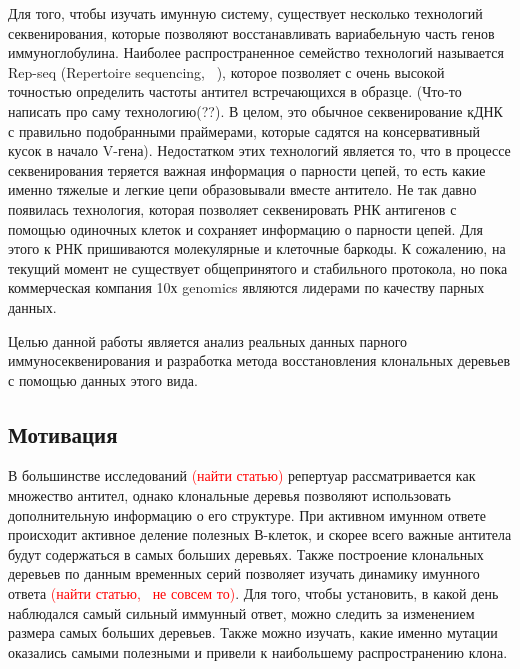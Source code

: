 \documentclass{spbau-diploma}
\newcommand{\todo}{\textcolor{red}}
\begin{document}
Для того, чтобы изучать имунную систему, существует несколько технологий секвенирования, которые позволяют восстанавливать вариабельную часть генов иммуноглобулина.
Наиболее распространенное семейство технологий называется Rep-seq (Repertoire sequencing, ~\cite{pmid22043864}), которое позволяет с очень высокой точностью определить частоты антител встречающихся в образце.
(Что-то написать про саму технологию(??).
В целом, это обычное секвенирование кДНК с правильно подобранными праймерами, которые садятся на консервативный кусок в начало V-гена).
Недостатком этих технологий является то, что в процессе секвенирования теряется важная информация о парности цепей, то есть какие именно тяжелые и легкие цепи образовывали вместе антитело.
Не так давно появилась технология, которая позволяет секвенировать РНК антигенов с помощью одиночных клеток и сохраняет информацию о парности цепей.
Для этого к РНК пришиваются молекулярные и клеточные баркоды.
К сожалению, на текущий момент не существует общепринятого и стабильного протокола, но пока коммерческая компания 10х genomics являются лидерами по качеству парных данных.

Целью данной работы является анализ реальных данных парного иммуносеквенирования и разработка метода восстановления клональных деревьев с помощью данных этого вида.




\subsection{Мотивация}

В большинстве исследований \todo{(найти статью)} репертуар рассматривается как множество антител, однако клональные деревья позволяют использовать дополнительную информацию о его структуре.
При активном имунном ответе происходит активное деление полезных В-клеток, и скорее всего важные антитела будут содержаться в самых больших деревьях.
Также построение клональных деревьев по данным временных серий позволяет изучать динамику имунного ответа \todo{(найти статью,~\cite{stern2014b} не совсем то)}.
Для того, чтобы установить, в какой день наблюдался самый сильный иммунный ответ, можно следить за изменением размера самых больших деревьев.
Также можно изучать, какие именно мутации оказались самыми полезными и привели к наибольшему распространению клона.
\end{document}
